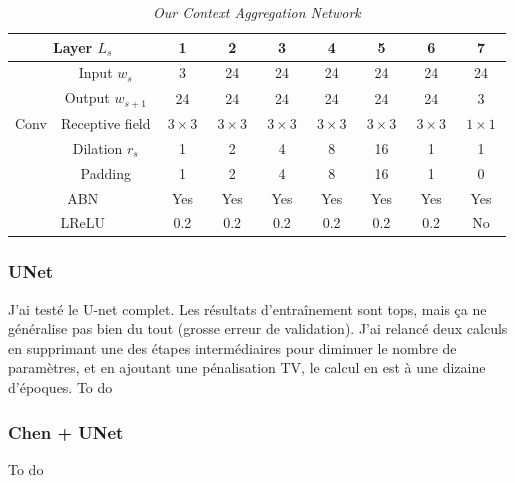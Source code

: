 \documentclass{article}
\begin{document}
            \begin{table}[!ht]
                \centering
                \begin{tabular}{|c|c||c|cccc|cc|}
                    \hline
                    \multicolumn{2}{|c||}{Layer $L_s$} & 1 & 2 & 3 & 4 & 5 & 6 & 7 \\
                    \hline
                    \hline
                     & Input $w_s$ & 3 & 24 & 24 & 24 & 24 & 24 & 24 \\
                     & Output $w_{s+1}$ & 24 & 24 & 24 & 24 & 24 & 24 & 3 \\
                    \cline{2-9}
                    Conv & Receptive field & $\ 3\times 3\ $ & $\ 3\times 3\ $ & $\ 3\times 3\ $ & $\ 3\times 3\ $ & $\ 3\times 3\ $ & $\ 3\times 3\ $ & $\ 1\times 1\ $ \\
                     & Dilation $r_s$ & 1 & 2 & 4 & 8 & 16 & 1 & 1 \\
                     & Padding & 1 & 2 & 4 & 8 & 16 & 1 & 0 \\
                    \hline
                    \multicolumn{2}{|c||}{ABN} & Yes & Yes & Yes & Yes & Yes & Yes & Yes \\
                    \hline
                    \multicolumn{2}{|c||}{LReLU} & 0.2 & 0.2 & 0.2 & 0.2 & 0.2 & 0.2 & No \\
                    \hline
                \end{tabular}
                \caption{\textit{Our Context Aggregation Network}}
            \end{table}

        \subsubsection{UNet}
        J'ai testé le U-net complet. Les résultats d'entraînement sont tops, mais ça ne généralise pas bien du tout (grosse erreur de validation). J'ai relancé deux calculs en supprimant une des étapes intermédiaires pour diminuer le nombre de paramètres, et en ajoutant une pénalisation TV, le calcul en est à une dizaine d'époques.
        To do
        \subsubsection{Chen + UNet}
        To do
\end{document}
